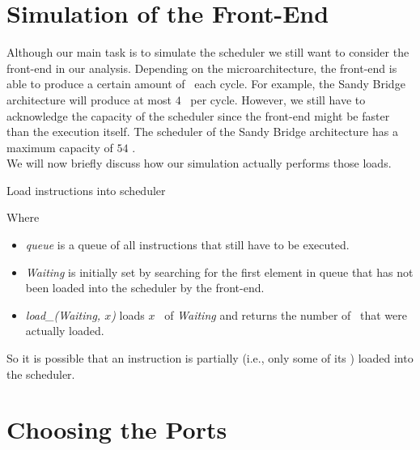 \section{Simulation of the Front-End}
\label{sec:simfrontend}

Although our main task is to simulate the scheduler we still want to consider the front-end in our analysis. Depending on the microarchitecture, the front-end is able to produce a certain amount of \microops\ each cycle. For example, the Sandy Bridge architecture will produce at most $4$ \microops\ per cycle. However, we still have to acknowledge the capacity of the scheduler since the front-end might be faster than the execution itself. The scheduler of the Sandy Bridge architecture has a maximum capacity of $54$ \microops.\\
We will now briefly discuss how our simulation actually performs those loads.
\newpage

\begin{algorithm}[H]
    \SetAlgoLined
    \caption{Load instructions into scheduler}
\end{algorithm}
\vspace{5pt}
Where
\begin{itemize}
    \item \emph{queue} is a queue of all instructions that still have to be executed.
    \item \emph{Waiting} is initially set by searching for the first element in queue that has not been loaded into the scheduler by the front-end.
    \item \emph{load\_\microops(Waiting, $x$)} loads $x$ \microops\ of \emph{Waiting} and returns the number of \microops\ that were actually loaded.
\end{itemize}

So it is possible that an instruction is partially (i.e., only some of its \microops) loaded into the scheduler.

\section{Choosing the Ports}
\label{sec:chooseport}

